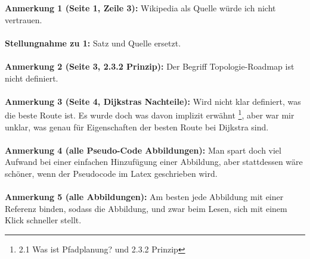 \documentclass[a4paper,12pt]{book}
\begin{document}
\textbf{Anmerkung 1 (Seite 1, Zeile 3):}
Wikipedia als Quelle würde ich nicht vertrauen.
\\ \\
\textbf{Stellungnahme zu 1:}
Satz und Quelle ersetzt.
\\ \\
\textbf{Anmerkung 2 (Seite 3, 2.3.2 Prinzip): }
Der Begriff Topologie-Roadmap ist nicht definiert.
\\ \\
\textbf{Anmerkung 3 (Seite 4, Dijkstras Nachteile):}
Wird nicht klar definiert, was die beste Route ist.
\newline
Es wurde doch was davon implizit erwähnt \footnote{ 2.1  Was ist Pfadplanung? und 2.3.2 Prinzip}, aber war mir unklar, was genau für Eigenschaften der besten Route bei Dijkstra sind.
 \\
\\
\textbf{Anmerkung 4 (alle Pseudo-Code Abbildungen):}
Man spart doch viel Aufwand bei einer einfachen Hinzufügung einer Abbildung, aber stattdessen wäre schöner, wenn der Pseudocode im Latex geschrieben wird. 
\\
\\
\textbf{Anmerkung 5 (alle Abbildungen):}
Am besten jede Abbildung mit einer Referenz binden, sodass die Abbildung, und zwar beim Lesen, sich mit einem Klick schneller stellt.
\\
\end{document}
